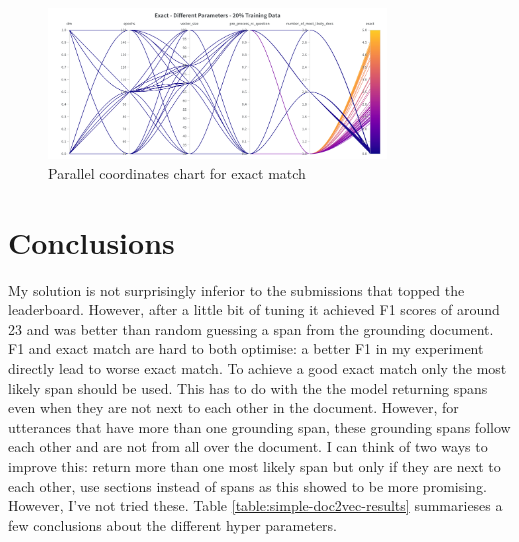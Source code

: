 \documentclass[11pt]{article}
\begin{document}
    \begin{figure}[h]
        \centering
        \includegraphics[width=0.8\textwidth]{parallel-coordinates-exact-match}
        \caption{Parallel coordinates chart for exact match}
        \label{fig:parallel-coordinates-exact-match}
    \end{figure}


    \section{Conclusions}\label{sec:conclusions}

    My solution is not surprisingly inferior to the submissions that topped the leaderboard. However, after a little bit
    of tuning it achieved F1 scores of around 23 and was better than random guessing a span from the grounding document.
    F1 and exact match are hard to both optimise: a better F1 in my experiment directly lead to worse exact match.
    To achieve a good exact match
    only the most likely span should be used. This has to do with the the model returning spans even when they are not next to
    each other in the document. However, for utterances that have more than one grounding span,
    these grounding spans follow each other and are not from all over the document. I can think of two ways to improve this:
    return more than one most likely
    span but only if they are next to each other, use sections instead of spans as this showed to be more promising.
    However, I've not tried these. Table \ref{table:simple-doc2vec-results} summarieses a few conclusions about the
    different hyper parameters.
\end{document}
